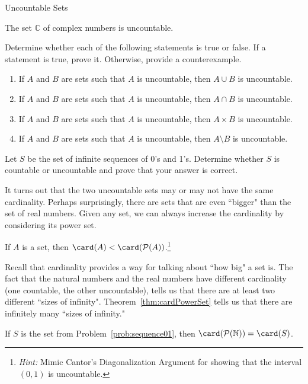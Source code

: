 \begin{section}{Uncountable Sets}
\begin{theorem}
The set $\mathbb{C}$ of complex numbers is uncountable.
\end{theorem}

\begin{problem}
Determine whether each of the following statements is true or false. If a statement is true, prove it.  Otherwise, provide a counterexample.
\begin{enumerate}[label=\textrm{(\alph*)}]
\item If $A$ and $B$ are sets such that $A$ is uncountable, then $A\cup B$ is uncountable.
\item If $A$ and $B$ are sets such that $A$ is uncountable, then $A\cap B$ is uncountable.
\item If $A$ and $B$ are sets such that $A$ is uncountable, then $A\times B$ is uncountable.
\item If $A$ and $B$ are sets such that $A$ is uncountable, then $A\setminus B$ is uncountable.
\end{enumerate}
\end{problem}

\begin{problem}\label{prob:sequence01} 
Let $S$ be the set of infinite sequences of 0's and 1's. Determine whether $S$ is countable or uncountable and prove that your answer is correct. 
\end{problem}

It turns out that the two uncountable sets may or may not have the same cardinality.  Perhaps surprisingly, there are sets that are even ``bigger" than the set of real numbers. Given any set, we can always increase the cardinality by considering its power set.

\begin{theorem}\label{thm:cardPowerSet}
If $A$ is a set, then $\card(A)<\card(\mathcal{P}(A))$.\footnote{\emph{Hint:} Mimic Cantor's Diagonalization Argument for showing that the interval $(0,1)$ is uncountable.}
\end{theorem}

Recall that cardinality provides a way for talking about ``how big" a set is. The fact that the natural numbers and the real numbers have different cardinality (one countable, the other uncountable), tells us that there are at least two different ``sizes of infinity".  Theorem~\ref{thm:cardPowerSet} tells us that there are infinitely many ``sizes of infinity."

\begin{theorem}
If $S$ is the set from Problem~\ref{prob:sequence01}, then $\card(\mathcal{P}(\mathbb{N}))=\card(S)$.
\end{theorem}

\end{section}